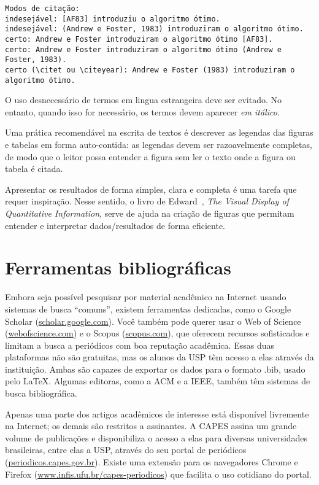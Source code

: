 \begin{verbatim}
Modos de citação:
indesejável: [AF83] introduziu o algoritmo ótimo.
indesejável: (Andrew e Foster, 1983) introduziram o algoritmo ótimo.
certo: Andrew e Foster introduziram o algoritmo ótimo [AF83].
certo: Andrew e Foster introduziram o algoritmo ótimo (Andrew e Foster, 1983).
certo (\citet ou \citeyear): Andrew e Foster (1983) introduziram o algoritmo ótimo.
\end{verbatim}

O uso desnecessário de termos em lingua estrangeira deve ser evitado. No entanto,
quando isso for necessário, os termos devem aparecer \textit{em itálico}.

Uma prática recomendável na escrita de textos é descrever as legendas das
figuras e tabelas em forma auto-contida: as legendas devem ser razoavelmente
completas, de modo que o leitor possa entender a figura sem ler o texto onde a
figura ou tabela é citada.

Apresentar os resultados de forma simples, clara e completa é uma tarefa que
requer inspiração. Nesse sentido, o livro de
Edward~\citet{tufte01:visualDisplay}, %
\emph{The Visual Display of Quantitative Information}, serve de ajuda na
criação de figuras que permitam entender e interpretar dados/resultados de forma
eficiente.

\section{Ferramentas bibliográficas}

Embora seja possível pesquisar por material acadêmico na Internet usando sistemas
de busca ``comuns'', existem ferramentas dedicadas, como o \textsf{Google Scholar}
(\url{scholar.google.com}). Você também pode querer usar o \textsf{Web of Science}
(\url{webofscience.com}) e o \textsf{Scopus} (\url{scopus.com}), que oferecem
recursos sofisticados e limitam a busca a periódicos com boa reputação acadêmica.
Essas duas plataformas não são gratuitas, mas os alunos da USP têm acesso a elas
através da instituição. Ambas são capazes de exportar os dados para o formato .bib,
usado pelo \LaTeX{}. Algumas editoras, como a ACM e a IEEE, também têm sistemas de
busca bibliográfica.

Apenas uma parte dos artigos acadêmicos de interesse está disponível livremente
na Internet; os demais são restritos a assinantes. A CAPES assina um grande
volume de publicações e disponibiliza o acesso a elas para diversas universidades
brasileiras, entre elas a USP, através do seu portal de periódicos
(\url{periodicos.capes.gov.br}). Existe uma extensão para os navegadores
Chrome e Firefox (\url{www.infis.ufu.br/capes-periodicos}) que facilita o uso
cotidiano do portal.

